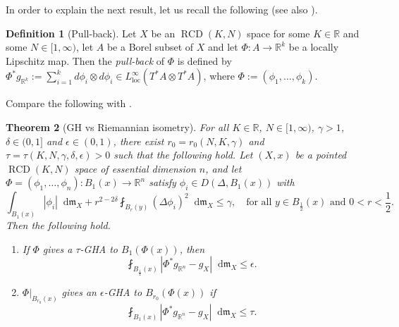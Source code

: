 \documentclass[11pt,reqno]{amsart}
\newtheorem{theorem}{Theorem}[section]
\theoremstyle{definition}
\newtheorem{definition}[theorem]{Definition}
\numberwithin{equation}{section}
\newcommand{\di}{\mathop{}\!\mathrm{d}}
\newcommand{\meas}{\mathfrak{m}}
\DeclareMathOperator{\loc}{loc}
\DeclareMathOperator{\RCD}{RCD}
\begin{document}
In order to explain the next result, let us recall the following (see also \cite{AHPT, Hisom, HS}).
\begin{definition}[Pull-back]
    Let $X$ be an $\RCD(K, N)$ space for some $K \in \mathbb{R}$ and some $N \in [1, \infty)$, let $A$ be a Borel subset of $X$ and let $\Phi:A \to \mathbb{R}^k$ be a locally Lipschitz map. Then the \textit{pull-back} of $\Phi$ is defined by $
    \Phi^*g_{\mathbb{R}^k}:=\sum_{i=1}^kd\phi_i\otimes d\phi_i \in L^{\infty}_{\loc}(T^*A \otimes T^*A)$, where $\Phi:=(\phi_1, \ldots, \phi_k)$.
\end{definition}

Compare the following with \cite[Proposition 4.2]{HP}.
\begin{theorem}[GH vs Riemannian isometry]\label{isomequiv}
    For all $K \in \mathbb{R}$, $N \in [1, \infty)$, $\gamma>1$, $\delta \in (0, 1]$ and $\epsilon \in (0,1)$, there exist $r_0=r_0(N,K,\gamma)$ and $\tau=\tau(K, N, \gamma, \delta, \epsilon)>0$ such that the following hold.
    Let $(X, x)$ be a pointed $\RCD(K, N)$ space of essential dimension $n$, and let $\Phi=(\phi_1, \ldots, \phi_n):B_1(x) \to \mathbb{R}^n$ 
    satisfy $\phi_i \in D(\Delta, B_1(x))$ with
    \begin{equation}\label{8asashfasiransaksrans}
        \int_{B_1(x)}|\phi_i|\di \meas_X+ r^{2-2\delta}\fint_{B_r(y)}(\Delta \phi_i)^2\di \meas_X \le \gamma,\quad \text{for all $y \in B_{\frac{1}{2}}(x)$ and $0<r<\frac{1}{2}$.}
    \end{equation}
    Then the following hold.
    \begin{enumerate}
        \item If $\Phi$ gives a $\tau$-GHA to $B_1(\Phi(x))$, then
        \begin{equation}
            \fint_{B_{\frac{1}{4}}(x)}\left| \Phi^*g_{\mathbb{R}^n}-g_X\right|\di \meas_X\le \epsilon.
        \end{equation}
        \item $\Phi|_{B_{r_0}(x)}$ gives an $\epsilon$-GHA to $B_{r_0}(\Phi(x))$ if
        \begin{equation}
            \fint_{B_1(x)}\left| \Phi^*g_{\mathbb{R}^n}-g_X\right|\di \meas_X\le \tau.
        \end{equation}
    \end{enumerate}
\end{theorem}
\end{document}
